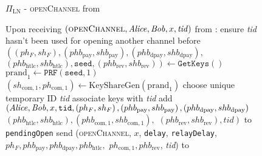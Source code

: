 \begin{figure}[!htbp]
  \begin{protocolbox}{$\Pi_{\mathrm{LN}}$ - \textsc{openChannel} from
  \environment}
    \begin{algorithmic}[1]
      \State Upon receiving $\left(\textsc{openChannel}, \mathit{Alice}, \mathit{Bob}, x,
      \mathit{tid}\right)$ from \environment:
      \Indent
        \State ensure \textit{tid} hasn't been used for opening another channel
        before
        \State $\left(\left(ph_F, sh_F\right), \left(phb_{\mathrm{pay}},
        shb_{\mathrm{pay}}\right), \left(phb_{\mathrm{dpay}},
        shb_{\mathrm{dpay}}\right),\right.$ $\left.\left(phb_{\mathrm{htlc}},
        shb_{\mathrm{htlc}}\right), \mathtt{seed}, \left(phb_{\mathrm{rev}},
        shb_{\mathrm{rev}}\right)\right) \gets \texttt{GetKeys}\left(\right)$
        \State $\mathrm{prand}_1 \gets \texttt{PRF}\left(\mathtt{seed},
        1\right)$
        \State $\left(sh_{\mathrm{com}, 1}, ph_{\mathrm{com}, 1}\right) \gets
        \mathrm{KeyShareGen}\left(\mathrm{prand}_1\right)$
        \State choose unique temporary ID \textit{tid} 
        \State associate keys with \textit{tid}
        \State add $\left(\mathit{Alice}, \mathit{Bob}, x, \mathtt{tid}, \left(ph_F,
        sh_F\right), \left(phb_{\mathrm{pay}}, shb_{\mathrm{pay}}\right),
        \left(phb_{\mathrm{dpay}}, shb_{\mathrm{dpay}}\right)\right.$
        $\left.\left(phb_{\mathrm{htlc}}, shb_{\mathrm{htlc}}\right),
        \left(phb_{\mathrm{com}, 1}, shb_{\mathrm{com}, 1}\right),\right.$
        $\left.\left(phb_{\mathrm{rev}}, shb_{\mathrm{rev}}\right),
        \mathit{tid}\right)$ to \texttt{pendingOpen}
        \State send (\textsc{openChannel}, $x$, \texttt{delay},
        \texttt{relayDelay}, $ph_F, phb_{\mathrm{pay}}, phb_{\mathrm{dpay}},
        phb_{\mathrm{htlc}},$ $ph_{\mathrm{com}, 1}, phb_{\mathrm{rev}}$,
        \textit{tid}) to \bob{}
      \EndIndent
    \end{algorithmic}
  \end{protocolbox}
  \caption{}
  \label{alg:protocol:open:env}
\end{figure}

